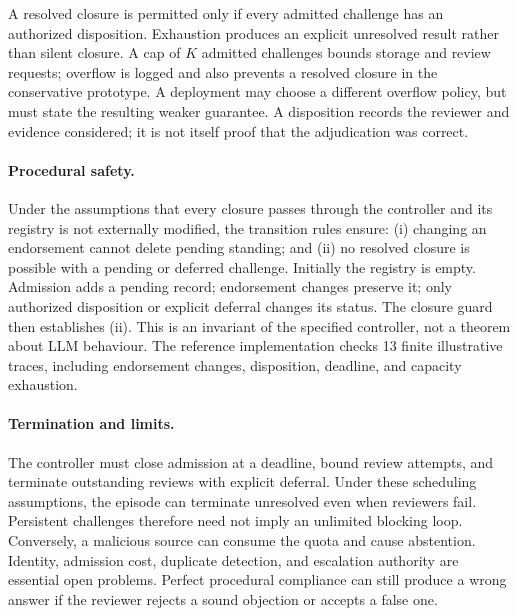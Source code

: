 \documentclass[sigconf,anonymous]{aamas}
\begin{document}
A resolved closure is permitted only if every admitted challenge has an authorized disposition. Exhaustion produces an explicit unresolved result rather than silent closure. A cap of $K$ admitted challenges bounds storage and review requests; overflow is logged and also prevents a resolved closure in the conservative prototype. A deployment may choose a different overflow policy, but must state the resulting weaker guarantee. A disposition records the reviewer and evidence considered; it is not itself proof that the adjudication was correct.

\paragraph{Procedural safety.}
Under the assumptions that every closure passes through the controller and its registry is not externally modified, the transition rules ensure: (i) changing an endorsement cannot delete pending standing; and (ii) no resolved closure is possible with a pending or deferred challenge. Initially the registry is empty. Admission adds a pending record; endorsement changes preserve it; only authorized disposition or explicit deferral changes its status. The closure guard then establishes (ii). This is an invariant of the specified controller, not a theorem about LLM behaviour. The reference implementation checks 13 finite illustrative traces, including endorsement changes, disposition, deadline, and capacity exhaustion.

\paragraph{Termination and limits.}
The controller must close admission at a deadline, bound review attempts, and terminate outstanding reviews with explicit deferral. Under these scheduling assumptions, the episode can terminate unresolved even when reviewers fail. Persistent challenges therefore need not imply an unlimited blocking loop. Conversely, a malicious source can consume the quota and cause abstention. Identity, admission cost, duplicate detection, and escalation authority are essential open problems. Perfect procedural compliance can still produce a wrong answer if the reviewer rejects a sound objection or accepts a false one.
\end{document}
